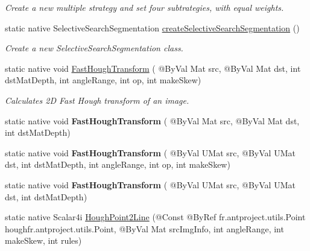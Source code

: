 \begin{DoxyCompactItemize}
\begin{DoxyCompactList}\small\item\em Create a new multiple strategy and set four subtrategies, with equal weights. \end{DoxyCompactList}\item 
static native Selective\+Search\+Segmentation \hyperlink{group__ximgproc__segmentation_gadfa823f2a25d59aaf55b7e0ce50ca67a}{create\+Selective\+Search\+Segmentation} ()
\begin{DoxyCompactList}\small\item\em Create a new Selective\+Search\+Segmentation class. \end{DoxyCompactList}\item 
static native void \hyperlink{classorg_1_1bytedeco_1_1javacpp_1_1opencv__ximgproc_a86b1be8a4536cf9ee5613a180ab05731}{Fast\+Hough\+Transform} ( @By\+Val Mat src, @By\+Val Mat dst, int dst\+Mat\+Depth, int angle\+Range, int op, int make\+Skew)
\begin{DoxyCompactList}\small\item\em Calculates 2D Fast Hough transform of an image. \end{DoxyCompactList}\item 
\mbox{\label{classorg_1_1bytedeco_1_1javacpp_1_1opencv__ximgproc_a7b460f03e6e846c1898c3b0bd3fe54b0}} 
static native void {\bfseries Fast\+Hough\+Transform} ( @By\+Val Mat src, @By\+Val Mat dst, int dst\+Mat\+Depth)
\item 
\mbox{\label{classorg_1_1bytedeco_1_1javacpp_1_1opencv__ximgproc_ada5b094b98a7cd9bb69a0d354ef5a1f6}} 
static native void {\bfseries Fast\+Hough\+Transform} ( @By\+Val U\+Mat src, @By\+Val U\+Mat dst, int dst\+Mat\+Depth, int angle\+Range, int op, int make\+Skew)
\item 
\mbox{\label{classorg_1_1bytedeco_1_1javacpp_1_1opencv__ximgproc_afeffe7892b68efac640829342cd5fabf}} 
static native void {\bfseries Fast\+Hough\+Transform} ( @By\+Val U\+Mat src, @By\+Val U\+Mat dst, int dst\+Mat\+Depth)
\item 
static native Scalar4i \hyperlink{classorg_1_1bytedeco_1_1javacpp_1_1opencv__ximgproc_a15b22eb13c2bff5ab308c1cc895e5f24}{Hough\+Point2\+Line} (@Const @By\+Ref fr.antproject.utils.Point hough\+fr.antproject.utils.Point, @By\+Val Mat src\+Img\+Info, int angle\+Range, int make\+Skew, int rules)

\end{DoxyCompactItemize}

